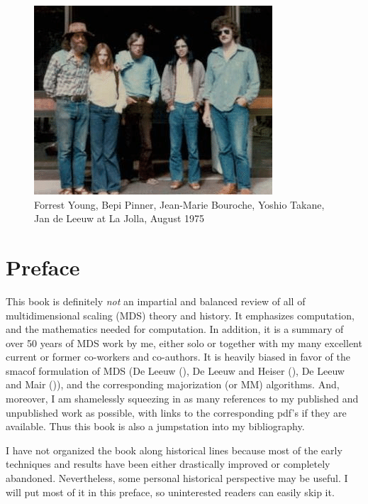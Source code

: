 \documentclass[
  12pt,
]{book}
\begin{document}
\begin{figure}

{\centering \includegraphics[width=0.6\linewidth]{graphics/lajolla_08_75} 

}

\caption{Forrest Young, Bepi Pinner, Jean-Marie Bouroche, Yoshio Takane, Jan de Leeuw 
 at La Jolla, August 1975}\label{fig:lajollapic}
\end{figure}

\chapter*{Preface}\label{preface}

This book is definitely \emph{not} an impartial and balanced review of all of
multidimensional scaling (MDS) theory and history. It emphasizes
computation, and the mathematics needed for computation. In addition, it
is a summary of over 50 years of MDS work by me, either solo or together
with my many excellent current or former co-workers and co-authors. It
is heavily biased in favor of the smacof formulation of MDS
(De Leeuw (), De Leeuw and Heiser (), De Leeuw and Mair ()), and the
corresponding majorization (or MM) algorithms. And, moreover, I am
shamelessly squeezing in as many references to my published and
unpublished work as possible, with links to the corresponding pdf's if
they are available. Thus this book is also a jumpstation into my
bibliography.

I have not organized the book along historical lines because most of the
early techniques and results have been either drastically improved or
completely abandoned. Nevertheless, some personal historical perspective
may be useful. I will put most of it in this preface, so uninterested
readers can easily skip it.
\end{document}
